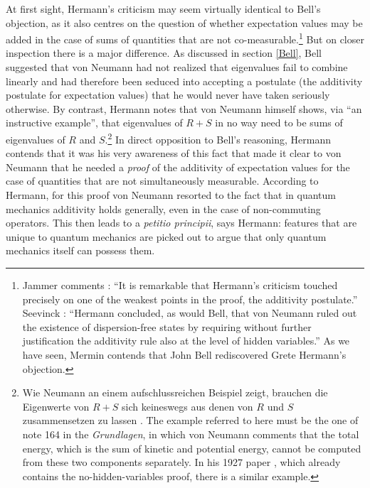 \documentclass[11pt]{article}
\begin{document}
At first sight, Hermann's criticism may seem virtually identical to Bell's objection, as it also centres on the question of whether expectation values may be added in the case of sums of quantities that are not co-measurable.\footnote{Jammer comments \cite[p.\@ 274]{jammer}: ``It is remarkable that Hermann's criticism touched precisely on one of the weakest points in the proof, the additivity postulate.'' Seevinck \cite[p.\@ 122]{seevinck}: ``Hermann concluded, as would Bell, that von Neumann ruled out the existence of dispersion-free states by requiring without further justification the additivity rule also at the level of hidden variables.'' As we have seen, Mermin \cite{mermin} contends that John Bell rediscovered Grete Hermann's objection.} But on closer inspection there is a major difference. As discussed in section \ref{Bell}, Bell suggested that von Neumann had not realized that eigenvalues fail to combine linearly and had therefore been seduced into accepting a postulate (the additivity postulate for expectation values) that he would never have taken seriously otherwise. By contrast, Hermann notes that von Neumann himself shows, via ``an instructive example'', that eigenvalues of $R + S$ in no way need to be sums of eigenvalues of $R$ and $S$.\footnote{Wie Neumann an einem aufschlussreichen Beispiel zeigt, brauchen die Eigenwerte von $R + S$ sich keineswegs aus denen von $R$ und $S$ zusammensetzen zu lassen \cite[p.\@ 19]{hermann3}. The example referred to here must be the one of note 164 in the \emph{Grundlagen}, in which von Neumann comments that the total energy, which is the sum of kinetic and potential energy, cannot be computed from these two components separately. In his 1927 paper \cite{VN2}, which already contains the no-hidden-variables proof, there is a similar example.} In direct opposition to Bell's reasoning, Hermann contends that it was his very awareness of this fact that made it clear to von Neumann that he needed a \emph{proof} of the additivity of expectation values for the case of quantities that are not simultaneously measurable. According to Hermann, for this proof von Neumann resorted to the fact that in quantum mechanics additivity holds generally, even in the case of non-commuting operators. This then leads to a \emph{petitio principii}, says Hermann: features that are unique to quantum mechanics are picked out to argue that only quantum mechanics itself can possess them.
\end{document}
